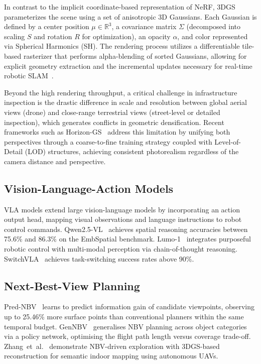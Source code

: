 \documentclass[conference]{IEEEtran}
\begin{document}
In contrast to the implicit coordinate-based representation of NeRF, 3DGS parameterizes the scene using a set of anisotropic 3D Gaussians. Each Gaussian is defined by a center position $\mu \in \mathbb{R}^3$, a covariance matrix $\Sigma$ (decomposed into scaling $S$ and rotation $R$ for optimization), an opacity $\alpha$, and color represented via Spherical Harmonics (SH). The rendering process utilizes a differentiable tile-based rasterizer that performs alpha-blending of sorted Gaussians, allowing for explicit geometry extraction and the incremental updates necessary for real-time robotic SLAM~\cite{lu2026fasterrethinkingrealtimeflow}.

Beyond the high rendering throughput, a critical challenge in infrastructure inspection is the drastic difference in scale and resolution between global aerial views (drone) and close-range terrestrial views (street-level or detailed inspection), which generates conflicts in geometric densification.
Recent frameworks such as Horizon-GS~\cite{lu2025horizongs} address this limitation by unifying both perspectives through a coarse-to-fine training strategy coupled with Level-of-Detail (LOD) structures, achieving consistent photorealism regardless of the camera distance and perspective.

\subsection{Vision-Language-Action Models}
\label{subsec:vla}

VLA models extend large vision-language models by incorporating an action output head, mapping visual observations and language instructions to robot control commands.
Qwen2.5-VL~\cite{bai2025qwen25vltechnicalreport} achieves spatial reasoning accuracies between 75.6\% and 86.3\% on the EmbSpatial benchmark.
Lumo-1~\cite{astribot2025lumo} integrates purposeful robotic control with multi-modal perception via chain-of-thought reasoning.
SwitchVLA~\cite{li2025switchvla} achieves task-switching success rates above 90\%.

\subsection{Next-Best-View Planning}
\label{subsec:nbv}

Pred-NBV~\cite{dhami2023prednbv} learns to predict information gain of candidate viewpoints, observing up to 25.46\% more surface points than conventional planners within the same temporal budget.
GenNBV~\cite{chen2024gennbv} generalises NBV planning across object categories via a policy network, optimising the flight path length versus coverage trade-off.
Zhang~et~al.~\cite{zhang2025autonomous} demonstrate NBV-driven exploration with 3DGS-based reconstruction for semantic indoor mapping using autonomous UAVs.
\end{document}
